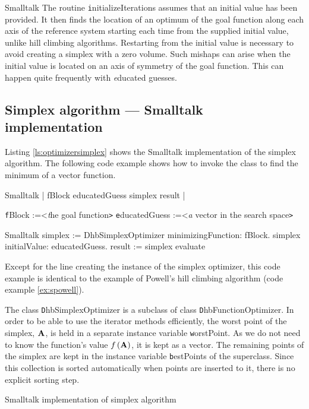 \begin{displaycode}{Smalltalk}
The routine {\texttt initializeIterations} assumes that an initial
value has been provided. It then finds the location of an optimum
of the goal function along each axis of the reference system
starting each time from the supplied initial value, unlike hill
climbing algorithms. Restarting from the initial value is
necessary to avoid creating a simplex with a zero volume. Such
mishaps can arise when the initial value is located on an axis of
symmetry of the goal function.
This can happen quite frequently with {\textsl educated guesses}.

\subsection{Simplex algorithm --- Smalltalk implementation}
 Listing \ref{ls:optimizersimplex} shows
the Smalltalk implementation of the simplex algorithm. The
following code example shows how to invoke the class to find the
minimum of a vector function.

\begin{displaycode}{Smalltalk}
 | fBlock educatedGuess simplex result |
\end{displaycode}
 {\texttt fBlock :=<\textsl the goal function\texttt >}\hfil\break
 {\texttt educatedGuess :=<\textsl a vector in the search space\texttt >}
\begin{displaycode}{Smalltalk}
 simplex := DhbSimplexOptimizer minimizingFunction: fBlock.
 simplex initialValue: educatedGuess.
 result := simplex evaluate
\end{displaycode}
Except for the line creating the instance of the simplex
optimizer, this code example is identical to the example of
Powell's hill climbing algorithm (code example \ref{ex:spowell}).

The class {\texttt DhbSimplexOptimizer} is a subclass of class {\texttt
DhbFunctionOptimizer}. In order to be able to use the iterator
methods efficiently, the worst point of the simplex, ${\textbf A}$, is
held in a separate instance variable {\texttt worstPoint}. As we do
not need to know the function's value $f\left({\textbf A}\right)$, it
is kept as a vector. The remaining points of the simplex are kept
in the instance variable {\texttt bestPoints} of the superclass. Since
this collection is sorted automatically when points are inserted
to it, there is no explicit sorting step.

\begin{listing} Smalltalk implementation of simplex algorithm
\label{ls:optimizersimplex}

\end{listing}


\end{displaycode}
